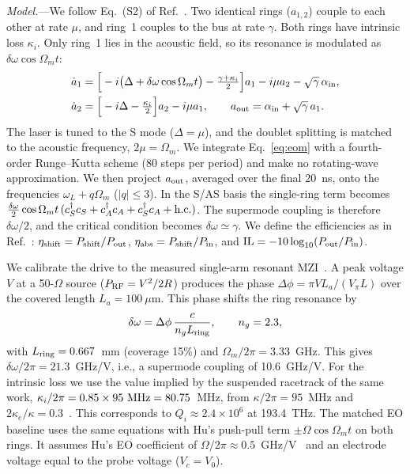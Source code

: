 \documentclass[aps,prl,reprint,superscriptaddress,amsmath,amssymb,floatfix]{revtex4-2}
\newcommand{\etash}{\eta_{\rm shift}}
\newcommand{\etaabs}{\eta_{\rm abs}}
\begin{document}
\emph{Model.}---We follow Eq.~(S2) of Ref.~\cite{Hu2021}. Two identical rings ($a_{1,2}$) couple to each other at rate $\mu$, and ring~1 couples to the bus at rate $\gamma$. Both rings have intrinsic loss $\kappa_i$. Only ring~1 lies in the acoustic field, so its resonance is modulated as $\delta\omega\cos\Omega_m t$:
\begin{align}
\dot a_1&=\Big[-i\big(\Delta+\delta\omega\cos\Omega_m t\big)-\tfrac{\gamma+\kappa_i}{2}\Big]a_1-i\mu a_2-\sqrt{\gamma}\,\alpha_{\rm in},\nonumber\\
\dot a_2&=\Big[-i\Delta-\tfrac{\kappa_i}{2}\Big]a_2-i\mu a_1,\qquad a_{\rm out}=\alpha_{\rm in}+\sqrt{\gamma}\,a_1 .
\label{eq:eom}
\end{align}
The laser is tuned to the S mode ($\Delta=\mu$), and the doublet splitting is matched to the acoustic frequency, $2\mu=\Omega_m$. We integrate Eq.~\eqref{eq:eom} with a fourth-order Runge--Kutta scheme (80 steps per period) and make no rotating-wave approximation. We then project $a_{\rm out}$, averaged over the final 20~ns, onto the frequencies $\omega_L+q\Omega_m$ ($|q|\le3$). In the S/AS basis the single-ring term becomes $\tfrac{\delta\omega}{2}\cos\Omega_m t\,(c_S^\dagger c_S+c_A^\dagger c_A+c_S^\dagger c_A+{\rm h.c.})$. The supermode coupling is therefore $\delta\omega/2$, and the critical condition becomes $\delta\omega\simeq\gamma$. We define the efficiencies as in Ref.~\cite{Hu2021}: $\etash=P_{\rm shift}/P_{\rm out}$, $\etaabs=P_{\rm shift}/P_{\rm in}$, and ${\rm IL}=-10\log_{10}(P_{\rm out}/P_{\rm in})$.

We calibrate the drive to the measured single-arm resonant MZI~\cite{Shao2019}. A peak voltage $V$ at a 50-$\Omega$ source ($P_{\rm RF}=V^2/2R$) produces the phase $\Delta\phi=\pi VL_a/(V_\pi L)$ over the covered length $L_a=100~\mu$m. This phase shifts the ring resonance by
\begin{equation}
\delta\omega=\Delta\phi\,\frac{c}{n_g L_{\rm ring}},\qquad n_g=2.3 ,
\label{eq:cal}
\end{equation}
with $L_{\rm ring}=0.667$~mm (coverage 15\%) and $\Omega_m/2\pi=3.33$~GHz. This gives $\delta\omega/2\pi=21.3$~GHz/V, i.e., a supermode coupling of 10.6~GHz/V. For the intrinsic loss we use the value implied by the suspended racetrack of the same work, $\kappa_i/2\pi=0.85\times95~{\rm MHz}=80.75$~MHz, from $\kappa/2\pi=95$~MHz and $2\kappa_e/\kappa=0.3$~\cite{Shao2019}. This corresponds to $Q_i\approx2.4\times10^6$ at 193.4~THz. The matched EO baseline uses the same equations with Hu's push-pull term $\pm\Omega\cos\Omega_m t$ on both rings. It assumes Hu's EO coefficient of $\Omega/2\pi\approx0.5$~GHz/V~\cite{Hu2021} and an electrode voltage equal to the probe voltage ($V_c=V_0$).
\end{document}
